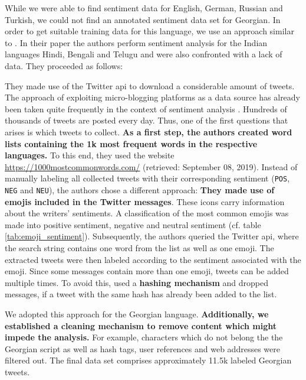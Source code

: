  While we were able to find sentiment data for English, German, Russian and Turkish, we could not find an annotated sentiment data set for Georgian. In order to get suitable training data for this language, we use an approach similar to \citep{Choudhary.2018}. In their paper the authors perform sentiment analysis for the Indian languages Hindi, Bengali and Telugu and were also confronted with a lack of data. They proceeded as follows:



They made use of the Twitter \gls{api} to download a considerable amount of tweets. The approach of exploiting micro-blogging platforms as a data source has already been taken quite frequently in the context of sentiment analysis \citep{Pak.2010,Agarwal.2011}. Hundreds of thousands of tweets are posted every day. Thus, one of the first questions that arises is which tweets to collect. \textbf{As a first step, the authors created word lists containing the 1k most frequent words in the respective languages.} To this end, they used the website \url{https://1000mostcommonwords.com/} (retrieved: September 08, 2019). Instead of manually labeling all collected tweets with their corresponding sentiment (\texttt{POS}, \texttt{NEG} and \texttt{NEU}), the authors chose a different approach: \textbf{They made use of emojis included in the Twitter messages}. These icons carry information about the writers' sentiments. A classification of the most common emojis was made into positive sentiment, negative and neutral sentiment (cf. table \vref{tab:emoji_sentiment}). Subsequently, the authors queried the Twitter \gls{api}, where the search string contains one word from the list as well as one emoji. The extracted tweets were then labeled according to the sentiment associated with the emoji. Since some messages contain more than one emoji, tweets can be added multiple times. To avoid this, \citep{Choudhary.2018} used a \textbf{hashing mechanism} and dropped messages, if a tweet with the same hash has already been added to the list.

We adopted this approach for the Georgian language. \textbf{Additionally, we established a cleaning mechanism to remove content which might impede the analysis.} For example, characters which do not belong the the Georgian script as well as hash tags, user references and web addresses were filtered out. The final data set comprises approximately 11.5k labeled Georgian tweets.

